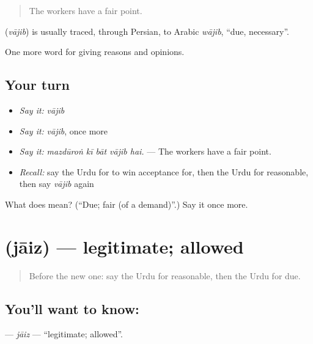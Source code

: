 \begin{quote}
The workers have a fair point.
\end{quote}

\begin{cousinweb}
\textbf{} (\emph{vājib}) is usually traced, through Persian, to Arabic \emph{wājib}, \textquotedblleft{}due, necessary\textquotedblright{}.
\end{cousinweb}

\begin{grammarlens}[title={What you've built}]
One more word for giving reasons and opinions.
\end{grammarlens}

\subsection*{Your turn}
\begin{itemize}
\raggedright
  \item \emph{Say it:} \emph{vājib}
  \item \emph{Say it:} \emph{vājib}, once more
  \item \emph{Say it:} \emph{mazdūroṅ kī bāt vājib hai.} — The workers have a fair point.
  \item \emph{Recall:} say the Urdu for to win acceptance for, then the Urdu for reasonable, then say \emph{vājib} again
\end{itemize}

\begin{tcolorbox}[breakable,colback=teal!4,colframe=teal!35!black,title={Before you move on}]
What does  mean? (\textquotedblleft{}Due; fair (of a demand)\textquotedblright{}.) Say it once more.
\end{tcolorbox}
\section[\texorpdfstring{\ur{جائز} (jāiz)}{جائز (jāiz)}]{ (jāiz) — legitimate; allowed}

\label{lesson:UR-C354-jaiz}



\begin{quote}
Before the new one: say the Urdu for reasonable, then the Urdu for due.
\end{quote}

\subsection*{You'll want to know: }
\textbf{} — \emph{jāiz} — \textquotedblleft{}legitimate; allowed\textquotedblright{}.

